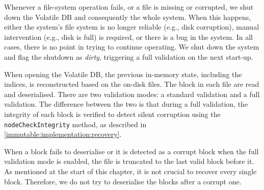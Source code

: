 Whenever a file-system operation fails, or a file is missing or corrupted, we
shut down the Volatile DB and consequently the whole system. When this happens,
either the system's file system is no longer reliable (e.g., disk corruption),
manual intervention (e.g., disk is full) is required, or there is a bug in the
system. In all cases, there is no point in trying to continue operating. We shut
down the system and flag the shutdown as \emph{dirty}, triggering a full
validation on the next start-up.

When opening the Volatile DB, the previous in-memory state, including the
indices, is reconstructed based on the on-disk files. The block in each file are
read and deserialised. There are two validation modes: a standard validation and
a full validation. The difference between the two is that during a full
validation, the integrity of each block is verified to detect silent corruption
using the \lstinline!nodeCheckIntegrity! method, as described in
\cref{immutable:implementation:recovery}.

When a block fails to deserialise or it is detected as a corrupt block when the
full validation mode is enabled, the file is truncated to the last valid block
before it. As mentioned at the start of this chapter, it is not crucial to
recover every single block. Therefore, we do not try to deserialise the blocks
after a corrupt one.
